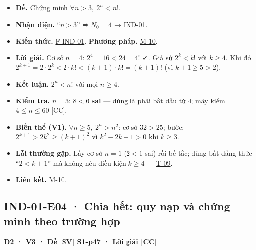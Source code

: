 \documentclass[
  10pt,
  twoside,openany]{book}
\providecommand{\tightlist}{%
  \setlength{\itemsep}{0pt}\setlength{\parskip}{0pt}}
\begin{document}
\begin{itemize}
\tightlist
\item
  \textbf{Đề.} Chứng minh \(\forall n>3,\ 2^n<n!\).
\item
  \textbf{Nhận diện.} ``\(n>3\)'' ⇒ \(N_0=4\) →
  \protect\hyperlink{IND-01}{IND-01}.
\item
  \textbf{Kiến thức.} \protect\hyperlink{F-IND-01}{F-IND-01}.
  \textbf{Phương pháp.} \protect\hyperlink{M-10}{M-10}.
\item
  \textbf{Lời giải.} Cơ sở \(n=4\): \(2^4=16<24=4!\) ✓. Giả sử
  \(2^k<k!\) với \(k\ge4\). Khi đó
  \(2^{k+1}=2\cdot2^k<2\cdot k!<(k+1)\cdot k!=(k+1)!\) (vì
  \(k+1\ge5>2\)).
\item
  \textbf{Kết luận.} \(2^n<n!\) với mọi \(n\ge4\).
\item
  \textbf{Kiểm tra.} \(n=3\): \(8<6\) \textbf{sai} --- đúng là phải bắt
  đầu từ 4; máy kiểm \(4\le n\le60\) {[}CC{]}.
\item
  \textbf{Biến thể (V1).} \(\forall n\ge5,\ 2^n>n^2\): cơ sở \(32>25\);
  bước: \(2^{k+1}>2k^2\ge(k+1)^2\) vì \(k^2-2k-1>0\) khi \(k\ge3\).
\item
  \textbf{Lỗi thường gặp.} Lấy cơ sở \(n=1\) (\(2<1\) sai) rồi bế tắc;
  dùng bất đẳng thức ``\(2<k+1\)'' mà không nêu điều kiện \(k\ge4\) ---
  \protect\hyperlink{T-09}{T-09}.
\item
  \textbf{Liên kết.} \protect\hyperlink{M-10}{M-10}.
\end{itemize}

\hypertarget{IND-01-E04}{%
\subsection{IND-01-E04 · Chia hết: quy nạp và chứng minh theo trường
hợp}\label{IND-01-E04}}

\textbf{D2 · V3 · Đề {[}SV{]} S1-p47 · Lời giải {[}CC{]}}
\end{document}
